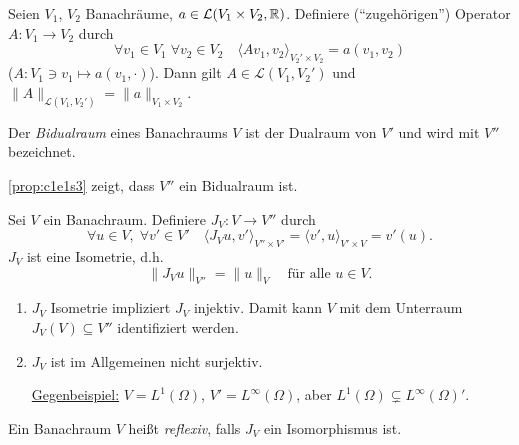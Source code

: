 \documentclass[../skript.tex]{subfiles}
\begin{document}
\begin{proposition} %
\label{prop:c1e2s5}
Seien $V_1$, $V_2$ Banachräume, $a \in \mathcal{L}(V_1 \times V_2, \mathbb{R})$. Definiere (``zugehörigen'') Operator $A : V_1 \to V_2$ durch
\[
	\forall v_1 \in V_1 \; \forall v_2 \in V_2 \quad \langle A v_1, v_2 \rangle_{V_2' \times V_2} = a(v_1, v_2)
\]
($A : V_1 \ni v_1 \mapsto a(v_1, \cdot)$).
Dann gilt $A \in \mathcal{L}(V_1, V_2')$ und $\| A \|_{\mathcal{L}(V_1, V_2')} = \| a \|_{V_1 \times V_2}$.
\end{proposition}
\begin{definition}[Bidualraum] %
\label{def:c1e2s6}
Der \emph{Bidualraum} eines Banachraums $V$ ist der Dualraum von $V'$ und wird mit $V''$ bezeichnet.
\end{definition}
\begin{remark} %
\label{bem:c1e2s7}
\cref{prop:c1e1s3} zeigt, dass $V''$ ein Bidualraum ist.
\end{remark}
\begin{proposition} %
\label{prop:c1e2s8}
Sei $V$ ein Banachraum. Definiere $J_V : V \to V''$ durch
\[
	\forall u \in V, \; \forall v' \in V' \quad \langle J_V u, v' \rangle_{V'' \times V'} = \langle v', u \rangle_{V' \times V} = v'(u).
\]
$J_V$ ist eine Isometrie, d.h.
\[
	\| J_V u \|_{V''} = \| u \|_{V} \quad \text{für alle } u \in V.
\]
\end{proposition}
\begin{remark} %
\label{bem:c1e2s9}
\begin{enumerate}
\item $J_V$ Isometrie impliziert $J_V$ injektiv. Damit kann $V$ mit dem Unterraum $J_V(V) \subseteq V''$ identifiziert werden.
\item $J_V$ ist im Allgemeinen nicht surjektiv. \par 
\underline{Gegenbeispiel:} $V = L^1(\Omega)$, $V' = L^\infty(\Omega)$, aber $L^1(\Omega) \subsetneq L^\infty(\Omega)'$.
\end{enumerate}
\end{remark}
\begin{definition} %
\label{def:c1e2s10}
Ein Banachraum $V$ heißt \emph{reflexiv}, falls $J_V$ ein Isomorphismus ist.
\end{definition}
\end{document}
